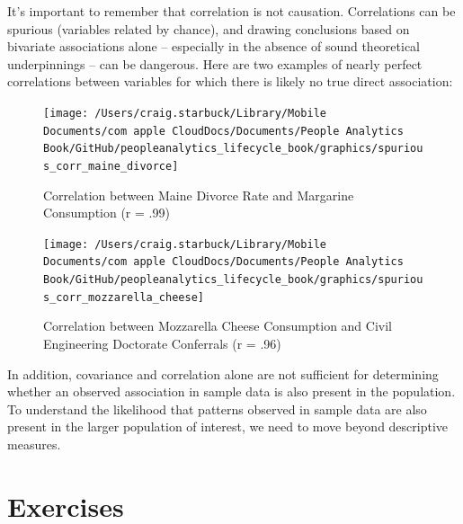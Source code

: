 \documentclass[]{book}
\begin{document}
It's important to remember that correlation is not causation. Correlations can be spurious (variables related by chance), and drawing conclusions based on bivariate associations alone -- especially in the absence of sound theoretical underpinnings -- can be dangerous. Here are two examples of nearly perfect correlations between variables for which there is likely no true direct association:

\begin{figure}

{\centering \texttt{[image: /Users/craig.starbuck/Library/Mobile Documents/com~apple~CloudDocs/Documents/People Analytics Book/GitHub/peopleanalytics\_lifecycle\_book/graphics/spurious\_corr\_maine\_divorce]} 

}

\caption{Correlation between Maine Divorce Rate and Margarine Consumption (r = .99)}\label{fig:spur-corr-1}
\end{figure}

\begin{figure}

{\centering \texttt{[image: /Users/craig.starbuck/Library/Mobile Documents/com~apple~CloudDocs/Documents/People Analytics Book/GitHub/peopleanalytics\_lifecycle\_book/graphics/spurious\_corr\_mozzarella\_cheese]} 

}

\caption{Correlation between Mozzarella Cheese Consumption and Civil Engineering Doctorate Conferrals (r = .96)}\label{fig:spur-corr-2}
\end{figure}

In addition, covariance and correlation alone are not sufficient for determining whether an observed association in sample data is also present in the population. To understand the likelihood that patterns observed in sample data are also present in the larger population of interest, we need to move beyond descriptive measures.

\hypertarget{exercises-1}{%
\section{Exercises}\label{exercises-1}}
\end{document}
